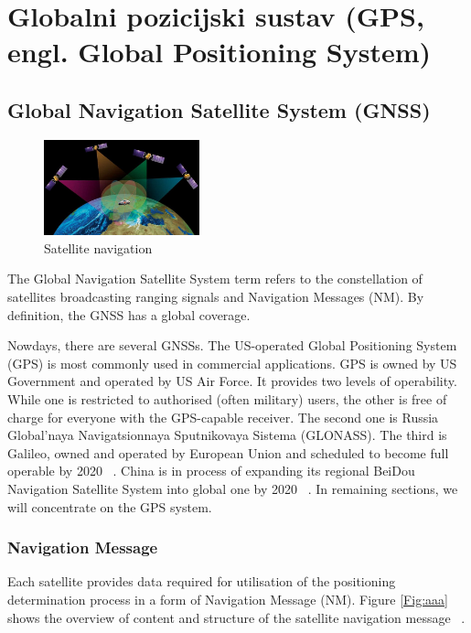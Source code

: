 \documentclass[a4paper,twoside,12pt]{memoir} %
\begin{document}
\chapter[Globalni pozicijski sustav (GPS)][GPS]{Globalni pozicijski sustav (GPS, engl. Global Positioning System)}
\section{Global Navigation Satellite System (GNSS)}
	
	\begin{figure}[h]
		\centering
		\includegraphics[width=0.4\textwidth]{pictureNav}
		\caption{Satellite navigation~\cite{bookProcessing} }
		\label{Fig:nn}
		
	\end{figure}
	The Global Navigation Satellite System term refers to the constellation of satellites broadcasting ranging signals and Navigation Messages (NM). By definition, the GNSS has a global coverage.
	
	
	Nowdays, there are several GNSSs.
	The US-operated Global Positioning System (GPS) is most commonly used
	in commercial applications. GPS is owned by US Government and operated by US Air Force. It provides two levels of operability. While one is restricted to authorised (often military) users, the other is free of charge for everyone with the GPS-capable receiver.
	The second one is Russia Global'naya Navigatsionnaya Sputnikovaya Sistema (GLONASS).
	The third is Galileo, owned and operated by European Union and scheduled to become full operable by 2020 ~\cite{bookProcessing}.
	China is in process of expanding its regional BeiDou Navigation Satellite System into global one by 2020 ~\cite{bookProcessing}.
	In remaining sections, we will concentrate on the GPS system.
	
	\subsection{Navigation Message}\label{sec:NM}
	Each satellite provides data required for utilisation of the positioning determination process in a form of Navigation Message (NM). Figure \ref{Fig:aaa}
	shows the overview of content and structure of the satellite navigation message ~\cite{GPS:1}.
	
\end{document}
